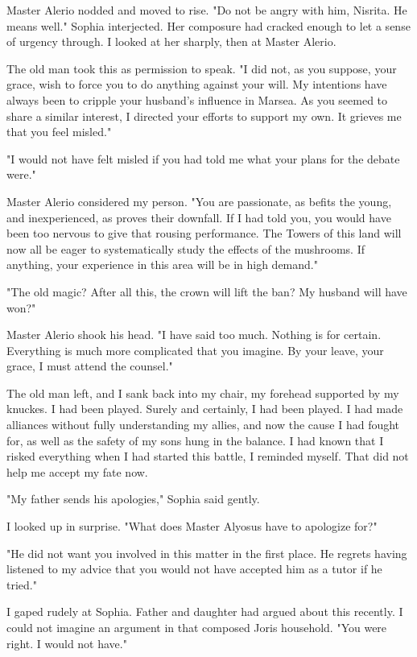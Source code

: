 \documentclass{article}
\begin{document}
Master Alerio nodded and moved to rise. "Do not be angry with him, Nisrita. He means well." Sophia interjected. Her composure had cracked enough to let a sense of urgency through. I looked at her sharply, then at Master Alerio.

The old man took this as permission to speak. "I did not, as you suppose, your grace, wish to force you to do anything against your will. My intentions have always been to cripple your husband's influence in Marsea. As you seemed to share a similar interest, I directed your efforts to support my own. It grieves me that you feel misled."

"I would not have felt misled if you had told me what your plans for the debate were."

Master Alerio considered my person. "You are passionate, as befits the young, and inexperienced, as proves their downfall. If I had told you, you would have been too nervous to give that rousing performance. The Towers of this land will now all be eager to systematically study the effects of the mushrooms. If anything, your experience in this area will be in high demand."

"The old magic? After all this, the crown will lift the ban? My husband will have won?"

Master Alerio shook his head. "I have said too much. Nothing is for certain. Everything is much more complicated that you imagine. By your leave, your grace, I must attend the counsel."

The old man left, and I sank back into my chair, my forehead supported by my knuckes. I had been played. Surely and certainly, I had been played. I had made alliances without fully understanding my allies, and now the cause I had fought for, as well as the safety of my sons hung in the balance. I had known that I risked everything when I had started this battle, I reminded myself. That did not help me accept my fate now.

"My father sends his apologies," Sophia said gently.

I looked up in surprise. "What does Master Alyosus have to apologize for?"

"He did not want you involved in this matter in the first place. He regrets having listened to my advice that you would not have accepted him as a tutor if he tried."

I gaped rudely at Sophia. Father and daughter had argued about this recently. I could not imagine an argument in that composed Joris household. "You were right. I would not have."
\end{document}
